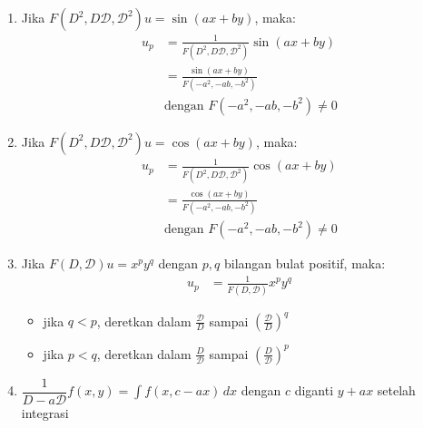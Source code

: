 \documentclass[a4paper,extrafontsizes, 9pt]{memoir}
\begin{document}
\begin{multicols}{3}
\begin{enumerate}
    \item Jika \( F(D^2, D\mathcal{D}, \mathcal{D}^2) u = \sin(ax + by) \), maka:
    \begin{align*}
        u_p &= \frac{1}{F(D^2, D\mathcal{D}, \mathcal{D}^2)} \sin(ax + by) \\
            &= \frac{\sin(ax + by)}{F(-a^2, -ab, -b^2)}  \\
            & \text{dengan } F(-a^2, -ab, -b^2) \ne 0
    \end{align*}
    
    \item Jika \( F(D^2, D\mathcal{D}, \mathcal{D}^2) u = \cos(ax + by) \), maka:
    \begin{align*}
        u_p &= \frac{1}{F(D^2, D\mathcal{D}, \mathcal{D}^2)} \cos(ax + by) \\
            &= \frac{\cos(ax + by)}{F(-a^2, -ab, -b^2)}  \\
            & \text{dengan } F(-a^2, -ab, -b^2) \ne 0
    \end{align*}
    
    \item Jika \( F(D, \mathcal{D}) u = x^p y^q \) dengan \( p, q \) bilangan bulat positif, maka:
    \begin{align*}
        u_p &= \frac{1}{F(D, \mathcal{D})} x^p y^q
    \end{align*}
    \begin{itemize}
        \item jika \( q < p \), deretkan dalam \( \frac{\mathcal{D}}{D} \) sampai \( \left( \frac{\mathcal{D}}{D} \right)^q \)
        \item jika \( p < q \), deretkan dalam \( \frac{D}{\mathcal{D}} \) sampai \( \left( \frac{D}{\mathcal{D}} \right)^p \)
    \end{itemize}

    \item $\dfrac{1}{D - a\mathcal{D}} f(x,y) = \int f(x, c - ax) \, dx$ dengan $c$ diganti $y + ax$ setelah integrasi

\end{enumerate}
	\end{multicols}
\end{document}
